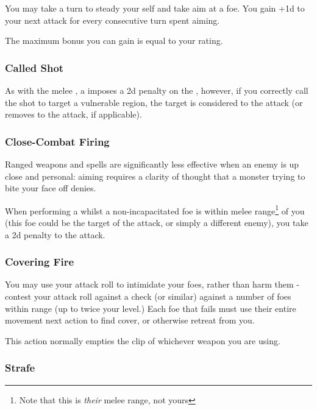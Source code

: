 You may take a turn to steady your self and take aim at a foe. You gain +1d to your next attack for every consecutive turn spent aiming. 

The maximum bonus you can gain is equal to your  rating. 

\subsubsection{Called Shot}

As with the melee , a  imposes a 2d penalty on the , however, if you correctly call the shot to target a vulnerable region, the target is considered  to the attack (or removes  to the attack, if applicable).

\subsubsection{Close-Combat Firing}

Ranged weapons and spells are significantly less effective when an enemy is up close and personal: aiming requires a clarity of thought that a monster trying to bite your face off denies. 

When performing a  whilst a non-incapacitated foe is within melee range\footnote{Note that this is {\it their} melee range, not yours} of you (this foe could be the target of the attack, or simply a different enemy), you take a 2d penalty to the attack. 


\subsubsection{Covering Fire}

You may use your attack roll to intimidate your foes, rather than harm them - contest your attack roll against a  check (or similar) against a number of foes within range (up to twice your  level.) Each foe that fails must use their entire movement next action to find cover, or otherwise retreat from you. 

This action normally empties the clip of whichever weapon you are using. 


\subsubsection{Strafe}

